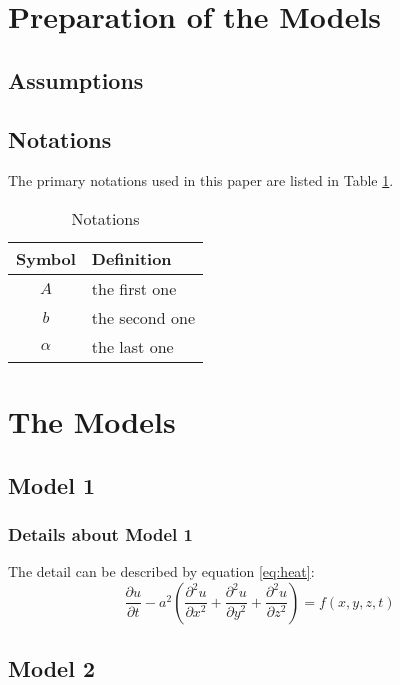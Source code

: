 \documentclass[12pt]{article}  %
\begin{document}
	\section{Preparation of the Models}
	\subsection{Assumptions}
	
	\subsection{Notations}
	The primary notations used in this paper are listed in Table \ref{tb:notation}.
	
	\begin{table}[!htbp]
		\begin{center}
			\caption{Notations}
			\begin{tabular}{cl}
				\toprule
				\multicolumn{1}{m{3cm}}{\centering Symbol}
				&\multicolumn{1}{m{8cm}}{\centering Definition}\\
				\midrule
				$A$&the first one\\
				$b$&the second one\\
				$\alpha$ &the last one\\
				\bottomrule
			\end{tabular}\label{tb:notation}
		\end{center}
	\end{table}
	
	\section{The Models}
	\subsection{Model 1}
	\subsubsection{Details about Model 1}
	The detail can be described by equation \eqref{eq:heat}:
	\begin{equation}\label{eq:heat}
		\frac{\partial u}{\partial t} - a^2 \left( \frac{\partial^2 u}{\partial x^2} + \frac{\partial^2 u}{\partial y^2} + \frac{\partial^2 u}{\partial z^2} \right) = f(x, y, z, t)
	\end{equation}
	
	\subsection{Model 2}
\end{document}
